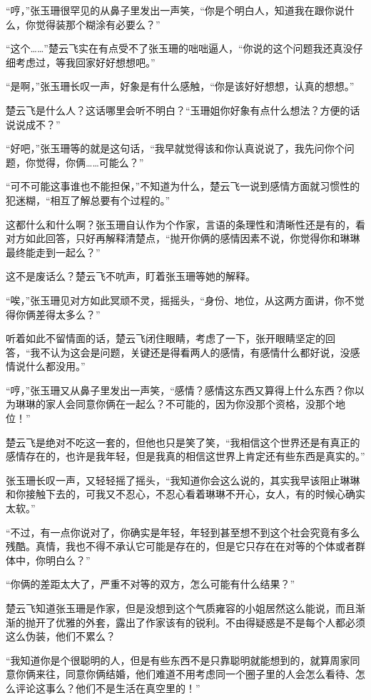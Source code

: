 “哼，”张玉珊很罕见的从鼻子里发出一声笑，“你是个明白人，知道我在跟你说什么，你觉得装那个糊涂有必要么？”

“这个……”楚云飞实在有点受不了张玉珊的咄咄逼人，“你说的这个问题我还真没仔细考虑过，等我回家好好想想吧。”

“是啊，”张玉珊长叹一声，好象是有什么感触，“你是该好好想想，认真的想想。”

楚云飞是什么人？这话哪里会听不明白？“玉珊姐你好象有点什么想法？方便的话说说成不？”

“好吧，”张玉珊等的就是这句话，“我早就觉得该和你认真说说了，我先问你个问题，你觉得，你俩……可能么？”

“可不可能这事谁也不能担保，”不知道为什么，楚云飞一说到感情方面就习惯性的犯迷糊，“相互了解总要有个过程的。”

这都什么和什么啊？张玉珊自认作为个作家，言语的条理性和清晰性还是有的，看对方如此回答，只好再解释清楚点，“抛开你俩的感情因素不说，你觉得你和琳琳最终能走到一起么？”

这不是废话么？楚云飞不吭声，盯着张玉珊等她的解释。

“唉，”张玉珊见对方如此冥顽不灵，摇摇头，“身份、地位，从这两方面讲，你不觉得你俩差得太多么？”

听着如此不留情面的话，楚云飞闭住眼睛，考虑了一下，张开眼睛坚定的回答，“我不认为这会是问题，关键还是得看两人的感情，有感情什么都好说，没感情说什么都没用。”

“哼，”张玉珊又从鼻子里发出一声笑，“感情？感情这东西又算得上什么东西？你以为琳琳的家人会同意你俩在一起么？不可能的，因为你没那个资格，没那个地位！”

楚云飞是绝对不吃这一套的，但他也只是笑了笑，“我相信这个世界还是有真正的感情存在的，也许是我年轻，但是我真的相信这世界上肯定还有些东西是真实的。”

张玉珊长叹一声，又轻轻摇了摇头，“我知道你会这么说的，其实我早该阻止琳琳和你接触下去的，可我又不忍心，不忍心看着琳琳不开心，女人，有的时候心确实太软。”

“不过，有一点你说对了，你确实是年轻，年轻到甚至想不到这个社会究竟有多么残酷。真情，我也不得不承认它可能是存在的，但是它只存在在对等的个体或者群体中，你明白么？”

“你俩的差距太大了，严重不对等的双方，怎么可能有什么结果？”

楚云飞知道张玉珊是作家，但是没想到这个气质雍容的小姐居然这么能说，而且渐渐的抛开了优雅的外套，露出了作家该有的锐利。不由得疑惑是不是每个人都必须这么伪装，他们不累么？

“我知道你是个很聪明的人，但是有些东西不是只靠聪明就能想到的，就算周家同意你俩来往，同意你俩结婚，他们难道不用考虑同一个圈子里的人会怎么看待、怎么评论这事么？他们不是生活在真空里的！”

